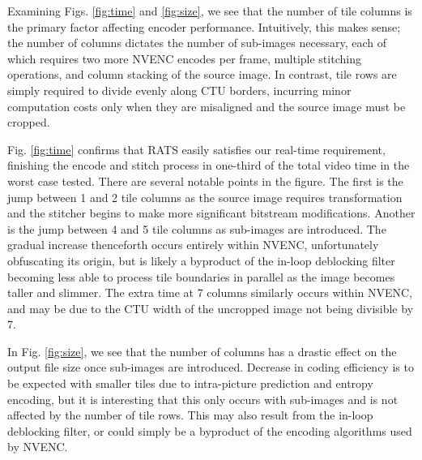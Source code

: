 Examining Figs. \ref{fig:time} and \ref{fig:size}, we see that the number of tile columns is the primary factor affecting encoder performance. Intuitively, this makes sense; the number of columns dictates the number of sub-images necessary, each of which requires two more NVENC encodes per frame, multiple stitching operations, and column stacking of the source image. In contrast, tile rows are simply required to divide evenly along CTU borders, incurring minor computation costs only when they are misaligned and the source image must be cropped.

Fig. \ref{fig:time} confirms that RATS easily satisfies our real-time requirement, finishing the encode and stitch process in one-third of the total video time in the worst case tested. There are several notable points in the figure. The first is the jump between 1 and 2 tile columns as the source image requires transformation and the stitcher begins to make more significant bitstream modifications. Another is the jump between 4 and 5 tile columns as sub-images are introduced. The gradual increase thenceforth occurs entirely within NVENC, unfortunately obfuscating its origin, but is likely a byproduct of the in-loop deblocking filter becoming less able to process tile boundaries in parallel as the image becomes taller and slimmer. The extra time at 7 columns similarly occurs within NVENC, and may be due to the CTU width of the uncropped image not being divisible by 7.

In Fig. \ref{fig:size}, we see that the number of columns has a drastic effect on the output file size once sub-images are introduced. Decrease in coding efficiency is to be expected with smaller tiles due to intra-picture prediction and entropy encoding, but it is interesting that this only occurs with sub-images and is not affected by the number of tile rows. This may also result from the in-loop deblocking filter, or could simply be a byproduct of the encoding algorithms used by NVENC.






